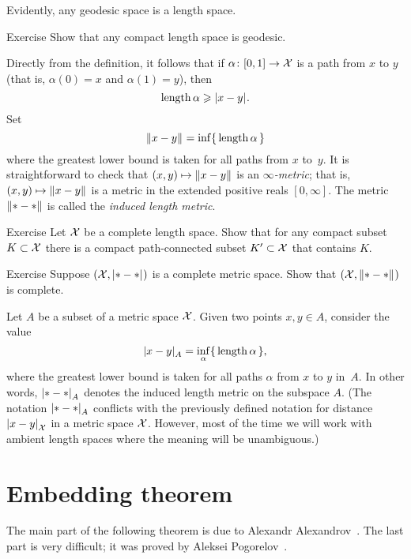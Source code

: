 Evidently, any geodesic space is a length space.

\begin{thm}{Exercise}
Show that any compact length space is geodesic.
\end{thm}


Directly from the definition, it follows that if $\alpha\colon[0,1]\to\mathcal{X}$ is a path from $x$ to $y$ 
(that is, $\alpha(0)=x$ and $\alpha(1)=y$), then 
\[\length\alpha\ge \dist{x}{y}{}.\]
Set 
\[\yetdist{x}{y}{}=\inf\{\,\length\alpha\,\}\]
where the greatest lower bound is taken for all paths from $x$ to~$y$.
It is straightforward to check that $(x,y)\mapsto \yetdist{x}{y}{}$ is an \emph{$\infty$-metric};
that is, $(x,y)\mapsto \yetdist{x}{y}{}$ is a metric in the extended positive reals $[0,\infty]$. 
The metric $\yetdist{*}{*}{}$ is called the \emph{induced length metric}.

\begin{thm}{Exercise}\label{ex:compact+connceted}
Let $\mathcal{X}$ be a complete length space.
Show that for any compact subset $K\subset\mathcal{X}$
there is a compact path-connected subset $K'\subset\mathcal{X}$ that contains $K$.  
\end{thm}

\begin{thm}{Exercise}\label{ex:compact=>complete}
Suppose $(\spc{X},\dist{*}{*}{})$ is a complete metric space.
Show that $(\spc{X},\yetdist{*}{*}{})$ is complete.
\end{thm}

Let $A$ be a subset of a metric space $\mathcal{X}$.
Given two points $x,y\in A$,
consider the value
\[\dist{x}{y}{A}=\inf_{\alpha}\{\,\length\alpha\,\},\]
where the greatest lower bound is taken for all paths $\alpha$ from $x$ to $y$ in~$A$.
In other words, $\dist{*}{*}{A}$ denotes the induced length metric on the subspace $A$.
(The notation $\dist{*}{*}{A}$ conflicts with the previously defined notation for distance $\dist{x}{y}{\spc{X}}$ in a metric space $\mathcal{X}$.
However, most of the time we will work with ambient length spaces where the meaning will be unambiguous.)

\section{Embedding theorem}

The main part of the following theorem is due to Alexandr Alexandrov~\cite{alexandrov-1948}.
The last part is very difficult; it was proved by Aleksei Pogorelov~\cite{pogorelov}.

